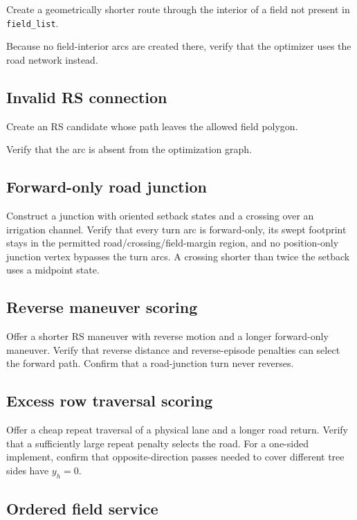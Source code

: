 \documentclass{article}
\begin{document}
Create a geometrically shorter route through the interior of a field not present in \texttt{field\_list}.

Because no field-interior arcs are created there, verify that the optimizer uses the road network instead.

\subsection{Invalid RS connection}

Create an RS candidate whose path leaves the allowed field polygon.

Verify that the arc is absent from the optimization graph.

\subsection{Forward-only road junction}

Construct a junction with oriented setback states and a crossing over an irrigation channel. Verify that every turn arc is forward-only, its swept footprint stays in the permitted road/crossing/field-margin region, and no position-only junction vertex bypasses the turn arcs. A crossing shorter than twice the setback uses a midpoint state.

\subsection{Reverse maneuver scoring}

Offer a shorter RS maneuver with reverse motion and a longer forward-only maneuver. Verify that reverse distance and reverse-episode penalties can select the forward path. Confirm that a road-junction turn never reverses.

\subsection{Excess row traversal scoring}

Offer a cheap repeat traversal of a physical lane and a longer road return. Verify that a sufficiently large repeat penalty selects the road. For a one-sided implement, confirm that opposite-direction passes needed to cover different tree sides have $y_h=0$.

\subsection{Ordered field service}
\end{document}
